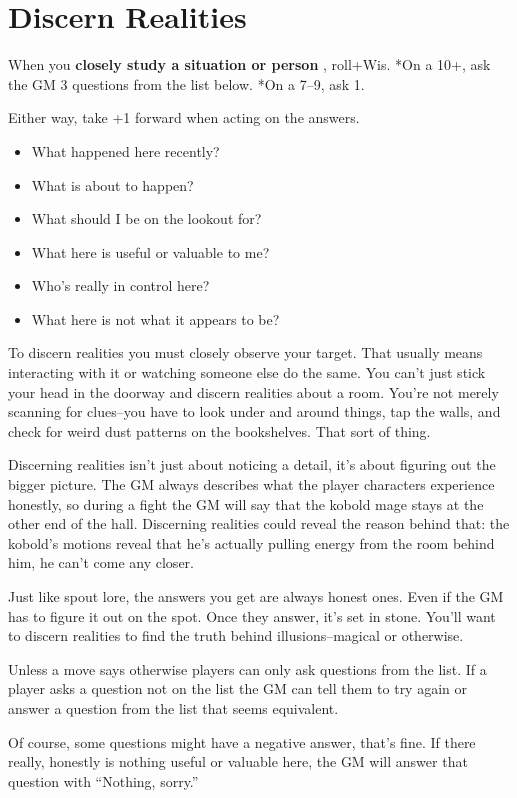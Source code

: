 \section*{Discern Realities}
\HRule
 When you \textbf{closely study a situation or person}
, roll+Wis. *On a 10+, ask the GM 3 questions from the list below. *On a 7--9, ask 1.


 Either way, take +1 forward when acting on the answers.
\begin{itemize}
\item What happened here recently?
\item What is about to happen?
\item What should I be on the lookout for?
\item What here is useful or valuable to me?
\item Who's really in control here?
\item What here is not what it appears to be?
\end{itemize}
\HRule

 To discern realities you must closely observe your target. That usually means interacting with it or watching someone else do the same. You can't just stick your head in the doorway and discern realities about a room. You're not merely scanning for clues--you have to look under and around things, tap the walls, and check for weird dust patterns on the bookshelves. That sort of thing.


 Discerning realities isn't just about noticing a detail, it's about figuring out the bigger picture. The GM always describes what the player characters experience honestly, so during a fight the GM will say that the kobold mage stays at the other end of the hall. Discerning realities could reveal the reason behind that: the kobold's motions reveal that he's actually pulling energy from the room behind him, he can't come any closer.


 Just like spout lore, the answers you get are always honest ones. Even if the GM has to figure it out on the spot. Once they answer, it's set in stone. You'll want to discern realities to find the truth behind illusions--magical or otherwise.


 Unless a move says otherwise players can only ask questions from the list. If a player asks a question not on the list the GM can tell them to try again or answer a question from the list that seems equivalent.


 Of course, some questions might have a negative answer, that's fine. If there really, honestly is nothing useful or valuable here, the GM will answer that question with ``Nothing, sorry.''


